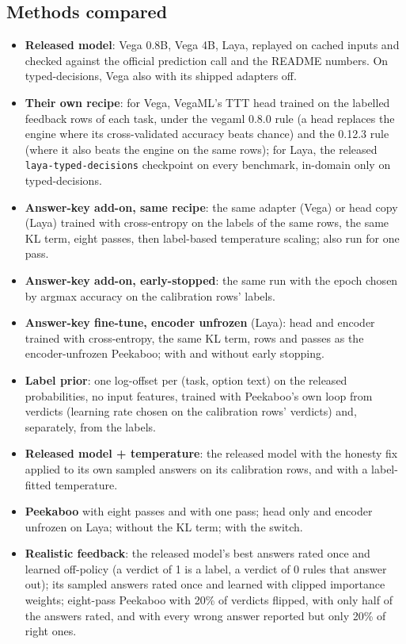 \documentclass[11pt]{article}
\newcommand{\pk}{Peekaboo}
\begin{document}
\subsection{Methods compared}
\begin{itemize}
\item \textbf{Released model}: Vega 0.8B, Vega 4B, Laya, replayed on cached inputs and checked against the official prediction call and the README numbers. On typed-decisions, Vega also with its shipped adapters off.
\item \textbf{Their own recipe}: for Vega, VegaML's TTT head trained on the labelled feedback rows of each task, under the vegaml 0.8.0 rule (a head replaces the engine where its cross-validated accuracy beats chance) and the 0.12.3 rule (where it also beats the engine on the same rows); for Laya, the released \texttt{laya-typed-decisions} checkpoint on every benchmark, in-domain only on typed-decisions.
\item \textbf{Answer-key add-on, same recipe}: the same adapter (Vega) or head copy (Laya) trained with cross-entropy on the labels of the same rows, the same KL term, eight passes, then label-based temperature scaling; also run for one pass.
\item \textbf{Answer-key add-on, early-stopped}: the same run with the epoch chosen by argmax accuracy on the calibration rows' labels.
\item \textbf{Answer-key fine-tune, encoder unfrozen} (Laya): head and encoder trained with cross-entropy, the same KL term, rows and passes as the encoder-unfrozen \pk{}; with and without early stopping.
\item \textbf{Label prior}: one log-offset per (task, option text) on the released probabilities, no input features, trained with \pk{}'s own loop from verdicts (learning rate chosen on the calibration rows' verdicts) and, separately, from the labels.
\item \textbf{Released model + temperature}: the released model with the honesty fix applied to its own sampled answers on its calibration rows, and with a label-fitted temperature.
\item \textbf{\pk{}} with eight passes and with one pass; head only and encoder unfrozen on Laya; without the KL term; with the switch.
\item \textbf{Realistic feedback}: the released model's best answers rated once and learned off-policy (a verdict of 1 is a label, a verdict of 0 rules that answer out); its sampled answers rated once and learned with clipped importance weights; eight-pass \pk{} with 20\% of verdicts flipped, with only half of the answers rated, and with every wrong answer reported but only 20\% of right ones.
\end{itemize}
\end{document}
